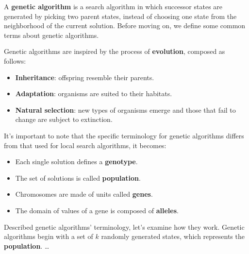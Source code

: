 A \textbf{genetic algorithm} is a search algorithm in which successor states are generated by picking two parent states, instead of choosing one state from the neighborhood of
the current solution. Before moving on, we define some common terms about genetic algorithms. \vspace{3.5pt}

Genetic algorithms are inspired by the process of \textbf{evolution}, composed as follows:
\begin{itemize}
    \renewcommand{\labelitemi}{-}
    \item \textbf{Inheritance}: offspring resemble their parents.
    \item \textbf{Adaptation}: organisms are suited to their habitats.
    \item \textbf{Natural selection}: new types of organisms emerge and those that fail to change are subject to extinction.
\end{itemize}

It's important to note that the specific terminology for genetic algorithms differs from that used for local search algorithms, it becomes:
\begin{itemize}
    \renewcommand{\labelitemi}{-}
    \item Each single solution defines a \textbf{genotype}.
    \item The set of solutions is called \textbf{population}.
    \item Chromosomes are made of units called \textbf{genes}.
    \item The domain of values of a gene is composed of \textbf{alleles}.
\end{itemize} \vspace{3.5pt}

Described genetic algorithms' terminology, let's examine how they work. Genetic algorithms begin with a set of $k$ randomly generated states, which represents the
\textbf{population}. \dots